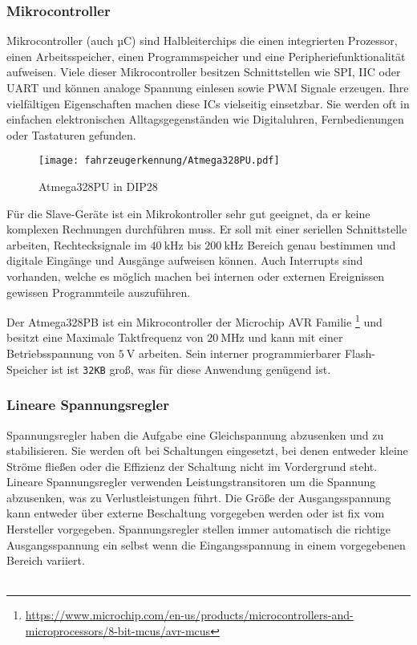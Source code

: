 \subsubsection{Mikrocontroller}

Mikrocontroller (auch µC) sind Halbleiterchips die einen integrierten Prozessor, einen Arbeitsspeicher, einen Programmspeicher und eine Peripheriefunktionalität aufweisen. Viele dieser Mikrocontroller besitzen Schnittstellen wie SPI, IIC oder UART
und können analoge Spannung einlesen sowie PWM Signale erzeugen. Ihre vielfältigen Eigenschaften machen diese ICs vielseitig einsetzbar. Sie werden oft in einfachen elektronischen Alltagsgegenständen wie Digitaluhren, Fernbedienungen oder Tastaturen gefunden. 

\begin{figure}[H]
    \centering
    \texttt{[image: fahrzeugerkennung/Atmega328PU.pdf]}
    \caption{Atmega328PU in DIP28}
\end{figure}

Für die Slave-Geräte ist ein Mikrokontroller sehr gut geeignet, da er keine komplexen Rechnungen durchführen muss. Er soll mit einer seriellen Schnittstelle arbeiten, Rechtecksignale im $\SI{40}{\kilo\hertz}$ bis $\SI{200}{\kilo\hertz}$ Bereich genau bestimmen und
digitale Eingänge und Ausgänge aufweisen können. Auch Interrupts sind vorhanden, welche es möglich machen bei internen oder externen Ereignissen gewissen Programmteile auszuführen.



Der Atmega328PB ist ein Mikrocontroller der Microchip AVR Familie \footnote{\url{https://www.microchip.com/en-us/products/microcontrollers-and-microprocessors/8-bit-mcus/avr-mcus}} und besitzt eine Maximale Taktfrequenz von $\SI{20}{\mega\hertz}$ und kann mit einer Betriebsspannung von $\SI{5}{\volt}$ arbeiten.
Sein interner programmierbarer Flash-Speicher ist ist \texttt{32KB} groß, was für diese Anwendung genügend ist.

\subsubsection{Lineare Spannungsregler}

Spannungsregler haben die Aufgabe eine Gleichspannung abzusenken und zu stabilisieren. Sie werden oft bei Schaltungen eingesetzt, bei denen entweder kleine Ströme fließen oder die Effizienz der Schaltung nicht im Vordergrund steht.
Lineare Spannungsregler verwenden Leistungstransitoren um die Spannung abzusenken, was zu Verlustleistungen führt. Die Größe der Ausgangsspannung kann entweder über externe Beschaltung vorgegeben werden oder ist fix vom Hersteller vorgegeben. Spannungsregler stellen 
immer automatisch die richtige Ausgangsspannung ein selbst wenn die Eingangsspannung in einem vorgegebenen Bereich variiert. 
\\ \\


